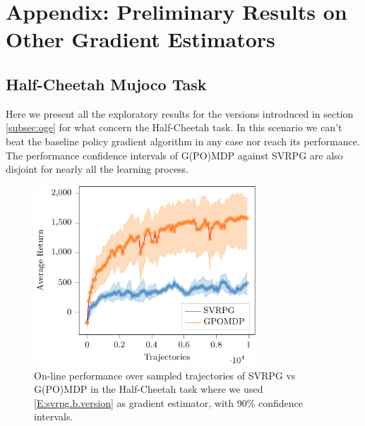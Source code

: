 \chapter{Appendix: Preliminary Results on Other Gradient Estimators}\label{chap:appendix}

\section{Half-Cheetah Mujoco Task}
\vspace{-0.05in}
Here we present all the exploratory results for the versions introduced in section \ref{subsec:oge} for what concern the Half-Cheetah task. In this scenario we can't beat the baseline policy gradient algorithm in any case nor reach its performance. The performance confidence intervals of G(PO)MDP against \acs{SVRPG} are also disjoint for nearly all the learning process.
\begin{figure}[h]
	\begin{minipage}[h]{1\textwidth}
		\centering
		\includegraphics[width=0.75\textwidth]{Images/Experiments/half_cheetah_GPOMDP_vs_NonSelf_SVRPG_B.pdf}
		\vspace{-0.1in}
		\caption{On-line performance over sampled trajectories of \acs{SVRPG} vs G(PO)MDP in the Half-Cheetah task where we used \ref{E:svrpg.b.version} as gradient estimator, with 90\% confidence intervals.}
		\label{fig:hcthree}
	\end{minipage}
	\vspace{-0.15in}
\end{figure}
